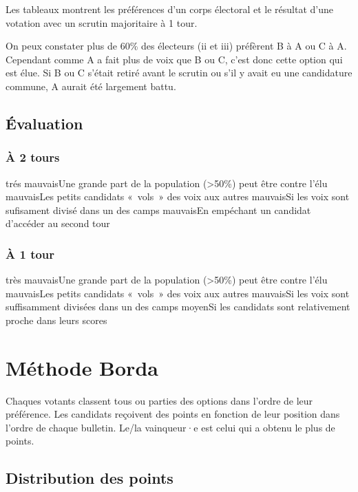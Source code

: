 \documentclass[../report]{subfiles}
\begin{document}
  Les tableaux  montrent les préférences d'un corps 
  électoral et le résultat d'une votation avec un scrutin majoritaire à 1 tour.

  On peux constater plus de 60\% des électeurs (ii et iii) préfèrent B à A ou C à A. 
  Cependant comme A a fait plus de voix que B ou C, c'est donc cette option qui est élue.
  Si B ou C s'était retiré avant le scrutin ou s'il y avait eu une candidature commune, A aurait été largement battu. 

  \subsection{Évaluation}
  \subsubsection{À 2 tours}
  \tabcritere%
    {trés mauvais}{Une grande part de la population (>50\%) peut être contre l'élu}%
    {mauvais}{Les petits candidats «~vols~» des voix aux autres}%
    {mauvais}{Si les voix sont sufisament divisé dans un des camps}%
    {mauvais}{En empéchant un candidat d'accéder au second tour}

  \subsubsection{À 1 tour}
  \tabcritere%
    {très mauvais}{Une grande part de la population (>50\%) peut être contre l'élu}%
    {mauvais}{Les petits candidats «~vols~» des voix aux autres}%
    {mauvais}{Si les voix sont suffisamment divisées dans un des camps}%
    {moyen}{Si les candidats sont relativement proche dans leurs scores}

  \section{Méthode Borda}
  
  Chaques votants classent tous ou parties des options dans l'ordre de leur préférence.
  Les candidats reçoivent des points en fonction de leur position dans l'ordre de chaque bulletin.
  Le/la vainqueur·e est celui qui a obtenu le plus de points.

  \subsection{Distribution des points}
\end{document}
